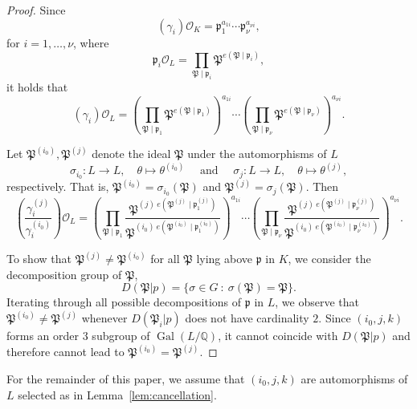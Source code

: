 \documentclass[11pt]{report}
\theoremstyle{definition}
\DeclareMathOperator{\Gal}{Gal}
\begin{document}
\begin{proof}
Since
\[(\gamma_i)\mathcal{O}_K = \mathfrak{p}_1^{a_{1i}} \cdots \mathfrak{p}_{\nu}^{a_{\nu i}},\]
for $i = 1, \dots, \nu$, where
\[\mathfrak{p}_i\mathcal{O}_L=\prod_{\mathfrak{P}\mid\mathfrak{p}_i} \mathfrak{P}^{e(\mathfrak{P}\mid\mathfrak{p}_i)},\]
it holds that
\[(\gamma_i)\mathcal{O}_L = \left(\prod_{\mathfrak{P}\mid\mathfrak{p}_1} \mathfrak{P}^{e(\mathfrak{P}\mid\mathfrak{p}_1)}\right)^{a_{1i}} \cdots \left(\prod_{\mathfrak{P}\mid\mathfrak{p}_{\nu}} \mathfrak{P}^{e(\mathfrak{P}\mid\mathfrak{p}_{\nu})}\right)^{a_{\nu i}}.\]

Let $\mathfrak{P}^{(i_0)},\mathfrak{P}^{(j)}$ denote the ideal $\mathfrak{P}$ under the automorphisms of $L$
\[\sigma_{i_0}: L \to L, \quad \theta \mapsto \theta^{(i_0)} \quad \text{ and } \quad \sigma_{j}: L \to L, \quad \theta \mapsto \theta^{(j)},\]
respectively. That is, $\mathfrak{P}^{(i_0)} = \sigma_{i_0}(\mathfrak{P})$ and $\mathfrak{P}^{(j)} = \sigma_{j}(\mathfrak{P})$. Then
\[\left( \frac{\gamma_i^{(j)}}{\gamma_i^{(i_0)}}\right)\mathcal{O}_L
	 = \left(\prod_{\mathfrak{P}\mid\mathfrak{p}_1} \frac{\mathfrak{P}^{(j) \ e(\mathfrak{P}^{(j)}\mid\mathfrak{p}_1^{(j)})}}{\mathfrak{P}^{(i_0) \ e(\mathfrak{P}^{(i_0)}\mid\mathfrak{p}^{(i_0)}_1)}}\right)^{a_{1i}} \cdots \left(\prod_{\mathfrak{P}\mid\mathfrak{p}_{\nu}} \frac{\mathfrak{P}^{(j) \ e(\mathfrak{P}^{(j)}\mid\mathfrak{p}^{(j)}_{\nu})}}{\mathfrak{P}^{(i_0) \ e(\mathfrak{P}^{(i_0)}\mid\mathfrak{p}^{(i_0)}_{\nu})}}\right)^{a_{\nu i}}.\]

To show that $\mathfrak{P}^{(j)} \neq \mathfrak{P}^{(i_0)}$ for all $\mathfrak{P}$ lying above $\mathfrak{p}$ in $K$, we consider the decomposition group of $\mathfrak{P}$,
\[D(\mathfrak{P}|p) = \{\sigma \in G \ : \ \sigma(\mathfrak{P}) = \mathfrak{P}\}.\]
Iterating through all possible decompositions of $\mathfrak{p}$ in $L$, we observe that $\mathfrak{P}^{(i_0)} \neq \mathfrak{P}^{(j)}$ whenever $D(\mathfrak{P}_i|p)$ does not have cardinality $2$. Since $(i_0,j,k)$ forms an order $3$ subgroup of $\Gal(L/\mathbb{Q})$, it cannot coincide with $D(\mathfrak{P}|p)$ and therefore cannot lead to $\mathfrak{P}^{(i_0)} = \mathfrak{P}^{(j)}$.
\end{proof}

For the remainder of this paper, we assume that $(i_0,j,k)$ are automorphisms of $L$ selected as in Lemma~\ref{lem:cancellation}.
\end{document}
